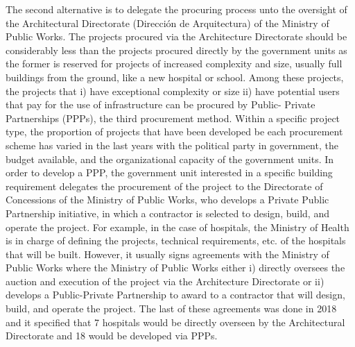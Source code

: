 The second alternative is to delegate the procuring process unto the oversight of the Architectural Directorate (Dirección de Arquitectura) of the Ministry of Public Works. The projects procured via the Architecture Directorate should be considerably less than the projects procured directly by the government units as the former is reserved for projects of increased complexity and size, usually full buildings from the ground, like a new hospital or school. Among these projects, the projects that i) have exceptional complexity or size ii) have potential users that pay for the use of infrastructure can be procured by Public- Private Partnerships (PPPs), the third procurement method. Within a specific project type, the proportion of projects that have been developed be each procurement scheme has varied in the last years with the political party in government, the budget available, and the organizational capacity of the government units. In order to develop a PPP, the government unit interested in a specific building requirement delegates the procurement of the project to the Directorate of Concessions of the Ministry of Public Works, who develops a Private Public Partnership initiative, in which a contractor is selected to design, build, and operate the project.
For example, in the case of hospitals, the Ministry of  Health is in charge of defining the projects, technical requirements, etc. of the hospitals that will be built. However, it usually signs agreements with the Ministry of Public Works where the Ministry of Public Works either i) directly oversees the auction and execution of the project via the Architecture Directorate or ii) develops a Public-Private Partnership to award to a contractor that will design, build, and operate the project. The last of these agreements was done in 2018 and it specified that 7 hospitals would be directly overseen by the Architectural Directorate and 18 would be developed via PPPs.

